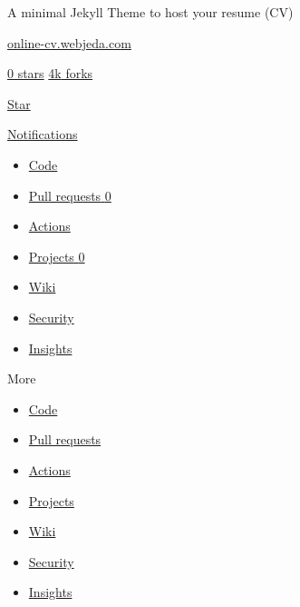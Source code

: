 \documentclass[
  english,
]{article}
\providecommand{\tightlist}{%
  \setlength{\itemsep}{0pt}\setlength{\parskip}{0pt}}
\begin{document}
\hypertarget{responsive-meta-container}{}
A minimal Jekyll Theme to host your resume (CV)

{ \href{https://online-cv.webjeda.com}{online-cv.webjeda.com} }

\href{/CptMike/online-cv/stargazers}{ {0} stars}
\href{/CptMike/online-cv/network/members}{ {4k} forks}

\href{/login?return_to=\%2FCptMike\%2Fonline-cv}{{ Star }}

\href{/login?return_to=\%2FCptMike\%2Fonline-cv}{Notifications}

\begin{itemize}
\tightlist
\item
  \protect\hypertarget{code-tab}{\href{/CptMike/online-cv}{ {Code}
  \protect\hypertarget{code-repo-tab-count}{}{}}}
\item
  \protect\hypertarget{pull-requests-tab}{\href{/CptMike/online-cv/pulls}{
  {Pull requests}
  \protect\hypertarget{pull-requests-repo-tab-count}{}{0}}}
\item
  \protect\hypertarget{actions-tab}{\href{/CptMike/online-cv/actions}{
  {Actions} \protect\hypertarget{actions-repo-tab-count}{}{}}}
\item
  \protect\hypertarget{projects-tab}{\href{/CptMike/online-cv/projects?type=beta}{
  {Projects} \protect\hypertarget{projects-repo-tab-count}{}{0}}}
\item
  \protect\hypertarget{wiki-tab}{\href{/CptMike/online-cv/wiki}{ {Wiki}
  \protect\hypertarget{wiki-repo-tab-count}{}{}}}
\item
  \protect\hypertarget{security-tab}{\href{/CptMike/online-cv/security}{
  {Security}}}
\item
  \protect\hypertarget{insights-tab}{\href{/CptMike/online-cv/pulse}{
  {Insights} \protect\hypertarget{insights-repo-tab-count}{}{}}}
\end{itemize}

{More}

\begin{itemize}
\tightlist
\item
  \href{/CptMike/online-cv}{Code}
\item
  \href{/CptMike/online-cv/pulls}{Pull requests}
\item
  \href{/CptMike/online-cv/actions}{Actions}
\item
  \href{/CptMike/online-cv/projects?type=beta}{Projects}
\item
  \href{/CptMike/online-cv/wiki}{Wiki}
\item
  \href{/CptMike/online-cv/security}{Security}
\item
  \href{/CptMike/online-cv/pulse}{Insights}
\end{itemize}
\end{document}
